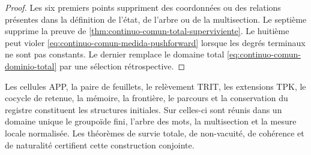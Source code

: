 \begin{proof}
Les six premiers points suppriment des coordonnées ou des relations présentes dans la définition de l'état, de l'arbre ou de la multisection. Le septième supprime la preuve de \cref{thm:continuo-comun-total-superviviente}. Le huitième peut violer \eqref{eq:continuo-comun-medida-pushforward} lorsque les degrés terminaux ne sont pas constants. Le dernier remplace le domaine total \eqref{eq:continuo-comun-dominio-total} par une sélection rétrospective.
\end{proof}

Les cellules APP, la paire de feuillets, le relèvement TRIT, les extensions TPK, le cocycle de retenue, la mémoire, la frontière, le parcours et la conservation du registre constituent les structures initiales. Sur celles-ci sont réunis dans un domaine unique le groupoïde fini, l'arbre des mots, la multisection et la mesure locale normalisée. Les théorèmes de survie totale, de non-vacuité, de cohérence et de naturalité certifient cette construction conjointe.
